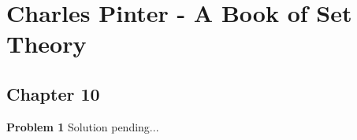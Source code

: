 \documentclass{article}
\begin{document}
\section*{Charles Pinter - A Book of Set Theory}
\subsection*{Chapter 10}

\textbf{Problem 1}
Solution pending...
\end{document}
